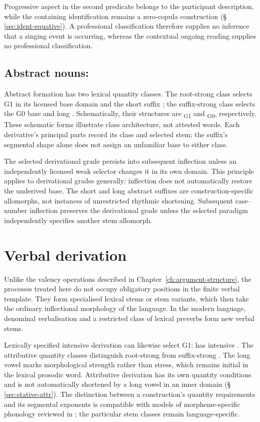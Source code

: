 Progressive aspect in the second predicate belongs to the participant
description, while the containing identification remains a zero-copula
construction (§\,\ref{sec:ident-equative}). A professional classification
therefore supplies no inference that a singing event is occurring, whereas
the contextual ongoing reading supplies no professional classification.

\subsection{Abstract nouns: }

Abstract formation has two lexical quantity classes. The root-strong class
selects G1 in its licensed base domain and the short suffix
; the suffix-strong class selects the G0 base and long
. Schematically, their structures are
\textsubscript{G1} and
\textsubscript{G0}, respectively. These schematic
forms illustrate class architecture, not attested words. Each derivative's
principal parts record its class and selected stem; the suffix's segmental
shape alone does not assign an unfamiliar base to either class.

The selected derivational grade persists into subsequent inflection unless
an independently licensed weak selector changes it in its own domain. This
principle applies to derivational grades generally: inflection does not
automatically restore the underived base. The short and long abstract
suffixes are construction-specific allomorphs, not instances of unrestricted
rhythmic shortening. Subsequent case--number inflection preserves the
derivational grade unless the selected paradigm independently specifies
another stem allomorph.


\section{Verbal derivation}

Unlike the valency operations described in Chapter~\ref{ch:argument-structure}, the
processes treated here do not occupy obligatory positions in the finite verbal
template. They form specialised lexical stems or stem variants, which then
take the ordinary inflectional morphology of the language. In the modern
language, denominal verbalisation and a restricted class of lexical preverbs
form new verbal stems.

Lexically specified intensive derivation can likewise select G1: 
has intensive . The attributive quantity classes distinguish
root-strong  from suffix-strong . The long vowel
marks morphological strength rather than stress, which remains initial in
the lexical prosodic word. Attributive derivation has its own quantity
conditions and is not automatically shortened by a long vowel in an inner
domain (§\,\ref{sec:stative-attr}).
The distinction between a construction's quantity requirements and its
segmental exponents is compatible with models of morpheme-specific phonology
reviewed in \cite{inkelas2017}; the particular stem classes remain
language-specific.

